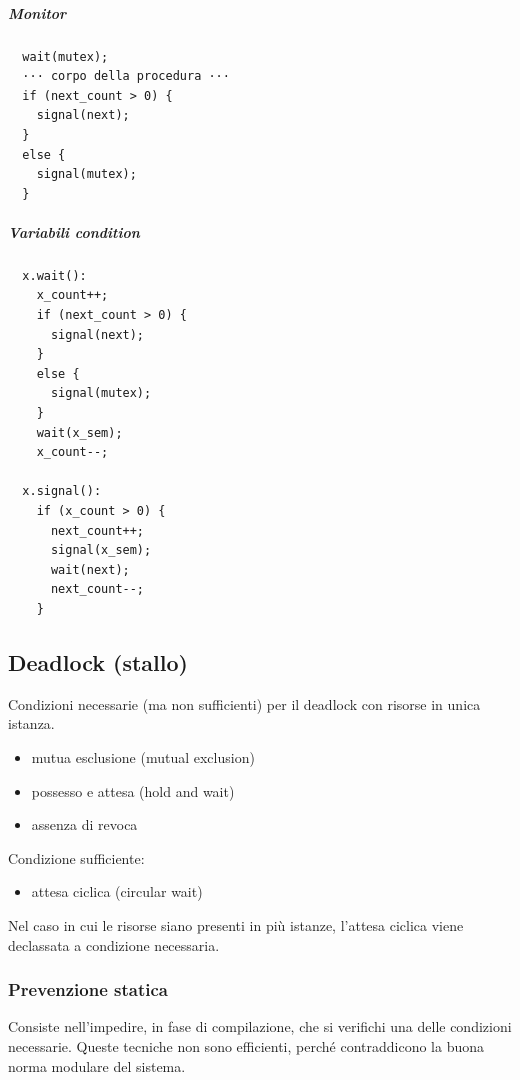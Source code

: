 \documentclass[12pt,a4paper]{article}
\begin{document}
\subparagraph{Monitor}
\begin{verbatim}
  wait(mutex);
  ··· corpo della procedura ···
  if (next_count > 0) {
    signal(next);
  }
  else {
    signal(mutex);
  }
\end{verbatim}

\subparagraph{Variabili condition}
\begin{verbatim}
  x.wait():
    x_count++;
    if (next_count > 0) {
      signal(next);
    }
    else {
      signal(mutex);
    }
    wait(x_sem);
    x_count--;

  x.signal():
    if (x_count > 0) {
      next_count++;
      signal(x_sem);
      wait(next);
      next_count--;
    }
\end{verbatim}

\subsection{Deadlock (stallo)}

Condizioni necessarie (ma non sufficienti) per il deadlock con risorse in
unica istanza.

\begin{itemize}
  \item mutua esclusione  (mutual exclusion)
  \item possesso e attesa (hold and wait)
  \item assenza di revoca
\end{itemize}

Condizione sufficiente:

\begin{itemize}
  \item attesa ciclica (circular wait)
\end{itemize}

Nel caso in cui le risorse siano presenti in più istanze, l'attesa ciclica
viene declassata a condizione necessaria.

\subsubsection{Prevenzione statica}
Consiste nell'impedire, in fase di compilazione, che si verifichi una delle
condizioni necessarie. Queste tecniche non sono efficienti, perché contraddicono
la buona norma modulare del sistema.
\end{document}
